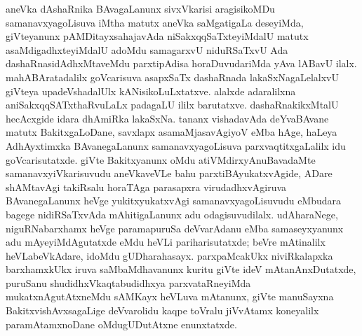 aneVka dAshaRnika BAvagaLanunx sivxVkarisi aragisikoMDu samanavxyagoLisuva iMtha matutx aneVka saMgatigaLa deseyiMda, giVteyanunx pAMDitayxsahajavAda niSakxqqSaTxte\-yiMdalU matutx asaMdigadhxteyiMdalU adoMdu samagarxvU niduRSaTxvU Ada dashaRna\-sidAdhxMtaveMdu parxtipAdisa horaDuvudariMda yAva lABavU ilalx. mahABAratadalilx goVcarisuva asapxSaTx dashaRnada lakaSxNagaLelalxvU giVteya upadeVsha\-dalUlx kANisikoLuLxtatxve. alalxde adaralilxna aniSakxqqSATxthaRvuLaLx padagaLU ililx barutatxve. dashaRnakikxMtalU hecAcxgide idara dhAmiRka lakaSxNa. tananx vishadavAda deYvaBAvane matutx BakitxgaLoDane, savxlapx asamaMjasavAgiyoV eMba hAge, haLeya AdhAyxtimxka BAvanegaLanunx samanavxyagoLisuva parxvaqtitxgaLalilx idu goVcarisutatxde. giVte Bakitxyanunx oMdu atiVMdirxyAnuBavadaMte samanavxyiVkarisuvudu aneVkaveVLe bahu parxtiBAyukatxvAgide, ADare shAMtavAgi takiRsalu horaTAga parasapxra virudadhxvAgiruva BAvanegaLanunx heVge yukitxyukatxvAgi samanavxyagoLisuvudu eMbudara bagege nidiRSaTxvAda mAhitigaLanunx adu odagisuvudilalx. udAharaNege, niguRNabarxhamx heVge paramapuruSa deVvarAdanu eMba samaseyxyanunx adu mAyeyiMdAgutatxde eMdu heVLi pariharisutatxde; beVre mAtinalilx heVLabeVkAdare, idoMdu gUDharahasayx. parxpaMcakUkx niviRkalapxka barxhamxkUkx iruva saMbaMdhavanunx kuritu giVte ideV mAtanAnxDutatxde, puruSanu shudidhxVkaqtabudidhxya parxvataRneyiMda mukatxnAgutAtxneMdu sAMKayx heVLuva mAtanunx, giVte manuSayxna BakitxvishAvxsagaLige deVvarolidu kaqpe toVralu jiVvAtamx koneyalilx paramAtamxnoDane oMdugUDutAtxne enunxtatxde. 


